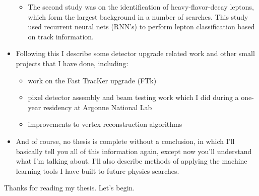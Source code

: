 \begin{itemize}
\begin{itemize}
        \item The second study was on the identification of heavy-flavor-decay leptons, which form the largest background in a number of searches. This study used recurrent neural nets (RNN's) to perform lepton classification based on track information.

    \end{itemize}

    \item Following this I describe some detector upgrade related work and other small projects that I have done, including:
    
    \begin{itemize}
        \item work on the Fast TracKer upgrade (FTk)
        \item pixel detector assembly and beam testing work which I did during a one-year residency at Argonne National Lab
        \item improvements to vertex reconstruction algorithms
    \end{itemize}

    \item And of course, no thesis is complete without a conclusion, in which I'll basically tell you all of this information again, except now you'll understand what I'm talking about. I'll also describe methods of applying the machine learning tools I have built to future physics searches.

\end{itemize}

Thanks for reading my thesis. Let's begin.
